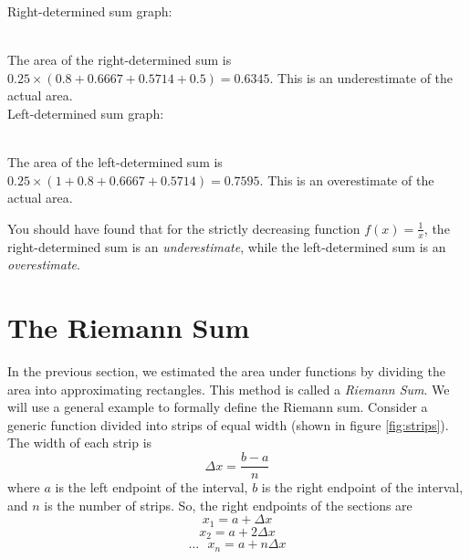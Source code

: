 \begin{Answer}[ref=rsum1]
	Right-determined sum graph:\\
	\\
	The area of the right-determined sum is $0.25\times(0.8+0.6667+0.5714+0.5) = 0.6345$. This is an underestimate of the actual area. \\
	Left-determined sum graph:\\
		\\
	The area of the left-determined sum is $0.25\times(1+0.8+0.6667+0.5714)=0.7595$. This is an overestimate of the actual area.
\end{Answer}

You should have found that for the strictly decreasing function $f(x) = \frac{1}{x}$, the right-determined sum is an \textit{underestimate}, while the left-determined sum is an \textit{overestimate}. \\


\section{The Riemann Sum}
In the previous section, we estimated the area under functions by dividing the area into approximating rectangles. This method is called a \textit{Riemann Sum}. We will use a general example to formally define the Riemann sum. Consider a generic function divided into strips of equal width (shown in figure \ref{fig:strips}). The width of each strip is $$\Delta x=\frac{b-a}{n}$$ where $a$ is the left endpoint of the interval, $b$ is the right endpoint of the interval, and $n$ is the number of strips. So, the right endpoints of the sections are $$x_1=a+\Delta x$$
$$x_2 = a +2\Delta x$$
$$\ldots \text{ }x_n=a+n\Delta x$$

